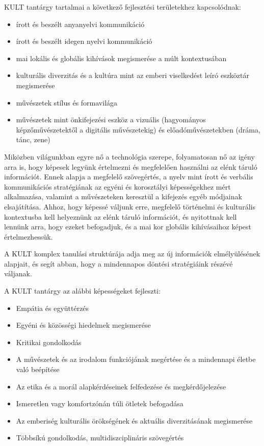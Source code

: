 KULT tantárgy tartalmai a következő fejlesztési területekhez kapcsolódnak:
\begin{itemize}
  \item írott és beszélt anyanyelvi kommunikáció

  \item írott és beszélt idegen nyelvi kommunikáció

  \item mai lokális és globális kihívások megismerése a múlt kontextusában

  \item kulturális diverzitás és a kultúra mint az emberi viselkedést leíró
        eszköztár megismerése

  \item művészetek stílus és formavilága

  \item művészetek mint önkifejezési eszköz a vizuális (hagyományos
        képzőművészetektől a digitális művészetekig) és előadóművészetekben (dráma,
        tánc, zene)
\end{itemize}

Miközben világunkban egyre nő a technológia szerepe, folyamatosan nő az igény
arra is, hogy képesek legyünk értelmezni és megfelelően használni az elénk
táruló információt. Ennek alapja a megfelelő szövegértés, a nyelv mint írott és
verbális kommunikációs stratégiának az egyéni és korosztályi képességekhez mért
alkalmazása, valamint a művészeteken keresztül a kifejezés egyéb módjainak
elsajátítása. Ahhoz, hogy képessé váljunk erre, megfelelő történelmi és
kulturális kontextusba kell helyeznünk az elénk táruló információt, és
nyitottnak kell lennünk arra, hogy ezeket befogadjuk, és a mai kor globális
kihívásaihoz képest értelmezhessük.

A KULT komplex tanulási struktúrája adja meg az új információk elmélyülésének
alapjait, és segít abban, hogy a mindennapos döntési stratégiáink részévé
váljanak.

A KULT tantárgy az alábbi képességeket fejleszti:
\begin{itemize}
  \item Empátia és együttérzés

  \item Egyéni és közösségi hiedelmek megismerése

  \item Kritikai gondolkodás

  \item A művészetek és az irodalom funkciójának megértése és a mindennapi életbe
        való beépítése

  \item Az etika és a morál alapkérdéseinek felfedezése és megkérdőjelezése

  \item Ismeretlen vagy komfortzónán túli ötletek befogadása

  \item Az emberiség kulturális örökségének és aktuális diverzitásának
        megismerése

  \item Többsíkú gondolkodás, multidiszciplináris szövegértés
\end{itemize}

